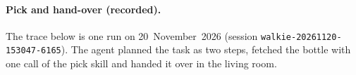 \documentclass[12pt,a4paper]{article}
\begin{document}
\newcommand{\trace}[2]{%
  \par\smallskip\noindent\fbox{\begin{minipage}{0.95\linewidth}\small
  \textbf{Request:} ``#1''\par\smallskip\ttfamily\footnotesize #2\end{minipage}}\par\medskip}

\paragraph{Pick and hand-over (recorded).}
The trace below is one run on 20~November~2026 (session \texttt{walkie-20261120-153047-6165}). The
agent planned the task as two steps, fetched the bottle with one call of the pick skill and handed it
over in the living room.
\end{document}
